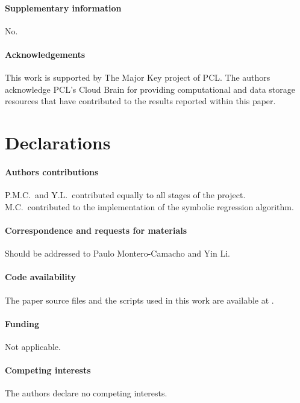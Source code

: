 \paragraph{\large Supplementary information} No.

\paragraph{\large Acknowledgements}
This work is supported by The Major Key project of PCL.
The authors acknowledge PCL's Cloud Brain for providing computational
and data storage resources that have contributed to the results reported
within this paper.

\section*{Declarations}

\paragraph{\large Authors contributions}
P.M.C.\ and Y.L.\ contributed equally to all stages of the project.
M.C.\ contributed to the implementation of the symbolic regression
algorithm.

\vspace{-1em}
\paragraph{\large Correspondence and requests for materials}
Should be addressed to Paulo Montero-Camacho and Yin Li.

\vspace{-1em}
\paragraph{\large Code availability}
The paper source files and the scripts used in this work are available
at \href{https://github.com/eelregit/5par}{\faGithub}.

\vspace{-1em}
\paragraph{\large Funding}
Not applicable.

\vspace{-1em}
\paragraph{\large Competing interests}
The authors declare no competing interests.

